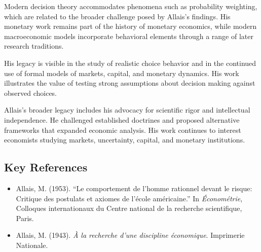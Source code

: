 Modern decision theory accommodates phenomena such as probability weighting,
which are related to the broader challenge posed by Allais's findings. His
monetary work remains part of the history of monetary economics, while modern
macroeconomic models incorporate behavioral elements through a range of later
research traditions.

His legacy is visible in the study of realistic choice behavior and in the
continued use of formal models of markets, capital, and monetary dynamics.
His work illustrates the value of testing strong assumptions about decision
making against observed choices.

Allais's broader legacy includes his advocacy for scientific rigor and
intellectual independence. He challenged established doctrines and proposed
alternative frameworks that expanded economic analysis. His work continues to
interest economists studying markets, uncertainty, capital, and monetary
institutions.

\subsection*{Key References}
\begin{itemize}
    \item Allais, M. (1953). ``Le comportement de l'homme rationnel devant le risque: Critique des postulats et axiomes de l'école américaine.'' In \textit{Économétrie}, Colloques internationaux du Centre national de la recherche scientifique, Paris.
    \item Allais, M. (1943). \textit{À la recherche d'une discipline économique}. Imprimerie Nationale.
\end{itemize}

